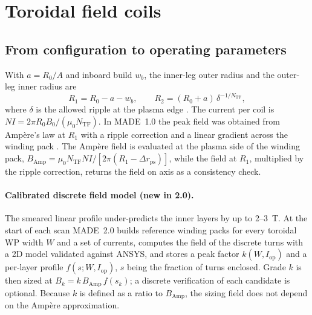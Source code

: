 \section{Toroidal field coils}
\label{sec:tf}

\subsection{From configuration to operating parameters}
With $a=R_0/A$ and inboard build $w_b$, the inner-leg outer radius and the
outer-leg inner radius are
\begin{equation}
  R_1 = R_0-a-w_b,\qquad R_2=(R_0+a)\,\delta^{-1/N_\mathrm{TF}},
\end{equation}
where $\delta$ is the allowed ripple at the plasma edge
. The current per
coil is $NI = 2\pi R_0 B_0/(\mu_0 N_\mathrm{TF})$. In MADE~1.0 the peak
field was obtained from Amp\`ere's law at $R_1$ with a ripple correction
and a linear gradient across the winding pack \cite{Giannini2023MADE}.
The Amp\`ere field is evaluated at the plasma side of the winding pack,
$B_\mathrm{Amp}=\mu_0 N_\mathrm{TF} NI/[2\pi(R_1-\Delta r_\mathrm{ps})]$,
while the field at $R_1$, multiplied by the ripple correction, returns
the field on axis as a consistency check.

\paragraph{Calibrated discrete field model (new in 2.0).}
The smeared linear profile under-predicts the inner layers by up to
2--3~T. At the start of each scan MADE~2.0 builds reference winding packs
for every toroidal WP width $W$ and a set of currents, computes the field
of the discrete turns with a 2D model validated against ANSYS, and stores
a peak factor $k(W,I_\mathrm{op})$ and a per-layer profile
$f(s;W,I_\mathrm{op})$, $s$ being the fraction of turns enclosed. Grade
$k$ is then sized at $B_k=k\,B_\mathrm{Amp}\,f(s_k)$; a discrete
verification of each candidate is optional. Because $k$ is defined as a
ratio to $B_\mathrm{Amp}$, the sizing field does not depend on the
Amp\`ere approximation.


